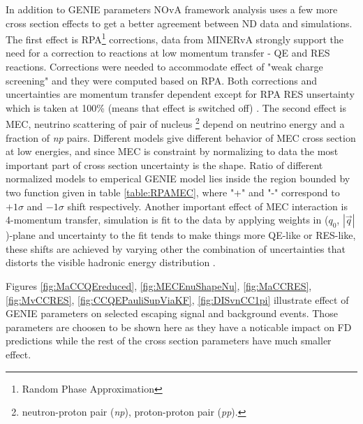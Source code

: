 In addition to GENIE parameters NOvA framework analysis uses a few more cross section effects to get a better agreement 
between ND data and simulations. The first effect is RPA\footnote{Random Phase Approximation} corrections, data from MINERvA 
\cite{MINERvA} strongly support the need for a correction to reactions at low momentum transfer - QE and RES reactions. 
Corrections were needed to accommodate effect of "weak charge screening" and they were computed based on RPA. Both corrections 
and uncertainties are momentum transfer dependent except for RPA RES unsertainty which is taken at 100\% (means that effect 
is switched off) \cite{Xsec2017_technote}. The second effect is MEC, neutrino scattering of pair of nucleus
\footnote{neutron-proton pair (\textit{np}), proton-proton pair (\textit{pp}).} depend on neutrino energy and a fraction of 
\textit{np} pairs. Different models give different behavior of MEC cross section at low energies, and since MEC is constraint 
by normalizing to data the most important part of cross section uncertainty is the shape. Ratio of different normalized models 
to emperical GENIE model lies inside the region bounded by two function given in table \ref{table:RPAMEC}, where "+" and "-" 
correspond to $+1\sigma$ and $-1\sigma$ shift respectively. Another important effect of MEC interaction is 4-momentum transfer, 
simulation is fit to the data by applying weights in ($q_0$, $|\vec{q}|$)-plane and uncertainty to the fit tends to make things 
more QE-like or RES-like, these shifts are achieved by varying other  the combination of uncertainties that distorts the visible 
hadronic energy distribution \cite{Xsec2018_technote}.

Figures \ref{fig:MaCCQEreduced}, \ref{fig:MECEnuShapeNu}, \ref{fig:MaCCRES}, \ref{fig:MvCCRES}, \ref{fig:CCQEPauliSupViaKF},
\ref{fig:DISvnCC1pi} illustrate effect of GENIE parameters on selected escaping signal and background events. Those parameters
are choosen to be shown here as they have a noticable impact on FD predictions while the rest of the cross section parameters
have much smaller effect.

